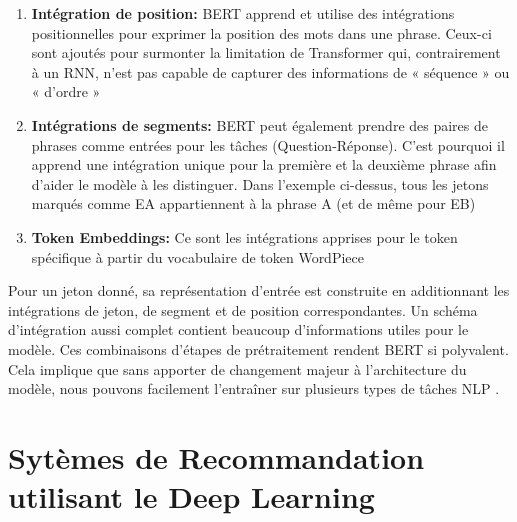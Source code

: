 \begin{enumerate}
                    \begin{enumerate}
                        
                        \item \textbf{Intégration de position:} BERT apprend et utilise des intégrations positionnelles pour exprimer la position des mots dans une phrase. Ceux-ci sont ajoutés pour surmonter la limitation de Transformer qui, contrairement à un RNN, n’est pas capable de capturer des informations de « séquence » ou « d'ordre »
                        
                        \item \textbf{Intégrations de segments:} BERT peut également prendre des paires de phrases comme entrées pour les tâches (Question-Réponse). C’est pourquoi il apprend une intégration unique pour la première et la deuxième phrase afin d’aider le modèle à les distinguer. Dans l’exemple ci-dessus, tous les jetons marqués comme EA appartiennent à la phrase A (et de même pour EB)
        
                        \item \textbf{Token Embeddings:} Ce sont les intégrations apprises pour le token spécifique à partir du vocabulaire de token WordPiece
                        
                    \end{enumerate}
                    
                \par Pour un jeton donné, sa représentation d’entrée est construite en additionnant les intégrations de jeton, de segment et de position correspondantes. Un schéma d’intégration aussi complet contient beaucoup d’informations utiles pour le modèle. Ces combinaisons d’étapes de prétraitement rendent BERT si polyvalent. Cela implique que sans apporter de changement majeur à l’architecture du modèle, nous pouvons facilement l’entraîner sur plusieurs types de tâches NLP \cite{ch2ref21,ch2ref22}.
                    
        \end{enumerate}
    
    
    




    
\section{Sytèmes de Recommandation utilisant le Deep Learning }

